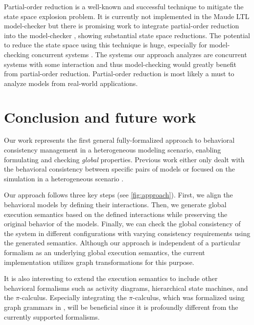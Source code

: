 \documentclass{jot}
\begin{document}
Partial-order reduction is a well-known and successful technique to mitigate the state space explosion problem.
It is currently not implemented in the Maude LTL model-checker but there is promising work to integrate partial-order reduction into the model-checker \cite{farzanPartialOrderReduction2007}, showing substantial state space reductions.
The potential to reduce the state space using this technique is huge, especially for model-checking concurrent systems \cite{clarkeHandbookModelChecking2018}.
The systems our approach analyzes are concurrent systems with some interaction and thus model-checking would greatly benefit from partial-order reduction.
Partial-order reduction is most likely a must to analyze models from real-world applications.

\section{Conclusion and future work} \label{sec:conclusion_and_future_work}
Our work represents the first general fully-formalized approach to behavioral consistency management in a heterogeneous modeling scenario, enabling formulating and checking \emph{global} properties.
Previous work either only dealt with the behavioral consistency between specific pairs of models \cite{yaoConsistencyCheckingUML2006, kusterExplicitBehavioralConsistency2003} or focused on the simulation in a heterogeneous scenario \cite{deantoniModelingBehavioralSemantics2016, varalarsenBCoolBehavioralCoordination2016, ekerTamingHeterogeneityPtolemy2003, leeDisciplinedHeterogeneousModeling2010}.

Our approach follows three key steps (see \autoref{fig:approach}).
First, we align the behavioral models by defining their interactions.
Then, we generate global execution semantics based on the defined interactions while preserving the original behavior of the models.
Finally, we can check the global consistency of the system in different configurations with varying consistency requirements using the generated semantics.
Although our approach is independent of a particular formalism as an underlying global execution semantics, the current implementation utilizes graph transformations for this purpose.

It is also interesting to extend the execution semantics to include other behavioral formalisms such as activity diagrams, hierarchical state machines, and the $\pi$-calculus.
Especially integrating the $\pi$-calculus, which was formalized using graph grammars in \cite{gadducciGraphRewritingPcalculus2007}, will be beneficial since it is profoundly different from the currently supported formalisms.
\end{document}
